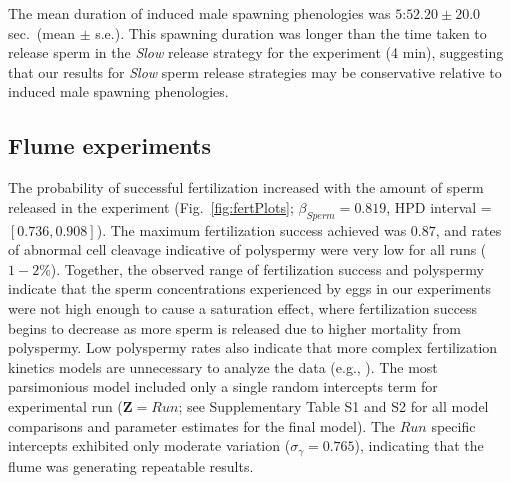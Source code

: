 \documentclass{article}
\begin{document}
	The mean duration of induced male spawning phenologies was $5$:$52.20 \pm 20.0$ sec.~(mean $\pm$ s.e.). This spawning duration was longer than the time taken to release sperm in the \textit{Slow} release strategy for the  experiment (4 min), suggesting that our results for \textit{Slow} sperm release strategies may be conservative relative to induced male spawning phenologies.

	\subsection*{Flume experiments}

	The probability of successful fertilization increased with the amount of sperm released in the  experiment (Fig.~\ref{fig:fertPlots}; $\beta_{Sperm} = 0.819$, HPD interval = $[0.736,0.908]$). The maximum fertilization success achieved was $0.87$, and rates of abnormal cell cleavage indicative of polyspermy were very low for all runs ($1-2\%$). Together, the observed range of fertilization success and polyspermy indicate that the sperm concentrations experienced by eggs in our experiments were not high enough to cause a saturation effect, where fertilization success begins to decrease as more sperm is released due to higher mortality from polyspermy. Low polyspermy rates also indicate that more complex fertilization kinetics models are unnecessary to analyze the data (e.g., \citealt{Vogel1982,MillarAnderson2003}). The most parsimonious model included only a single random intercepts term for experimental run ($\mathbf{Z} = Run$; see Supplementary Table S1 and S2 for all model comparisons and parameter estimates for the final model). The $Run$ specific intercepts exhibited only moderate variation ($\sigma_{\gamma} = 0.765$), indicating that the flume was generating repeatable results.
\end{document}
